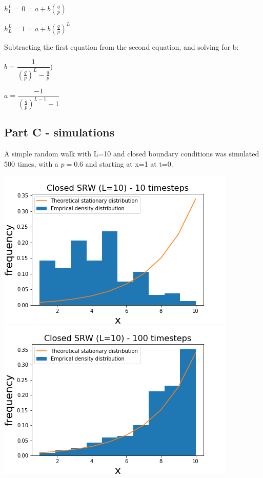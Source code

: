 \documentclass{article}
\begin{document}
$h_1^L = 0 = a + b(\frac{q}{p})$

$h_L^L = 1 = a + b(\frac{q}{p})^L$

Subtracting the first equation from the second equation, and solving for b:

$b = \dfrac{1}{(\frac{q}{p})^{L}-\frac{q}{p}})$

$a = \dfrac{-1}{(\frac{q}{p})^{L-1}-1}$


\subsection{Part C - simulations}

A simple random walk with L=10 and closed boundary conditions was simulated 500 times, with a $p=0.6$ and starting at x=1 at t=0.


\includegraphics[scale=1]{10_steps_a.png} 
\includegraphics[scale=1]{100_steps_a.png} 
\end{document}
